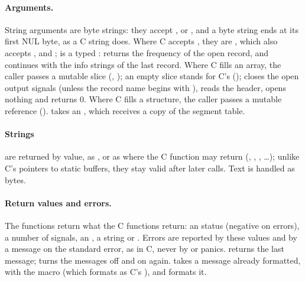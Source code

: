\paragraph{Arguments.} String arguments are byte strings: they accept ,
\code{\&[u8]} or , and a byte string ends at its first NUL byte, as a C
string does. Where C accepts , they are , which also
accepts ,  and ;
 is a typed :  returns the frequency of
the open record, and  continues with the info strings of the last
record. Where C fills an array, the caller passes a mutable slice
(, ); an empty slice stands for
C's  (); 
closes the open output signals (unless the record name begins with \code{+}), reads the
header, opens nothing and returns 0. Where C fills a structure, the caller passes a
mutable reference ().  takes an
, which receives a copy of the segment table.

\paragraph{Strings} are returned by value, as , or as
 where the C function may return  (,
, , \ldots); unlike C's pointers to static buffers, they stay
valid after later calls. Text is handled as bytes.

\paragraph{Return values and errors.} The functions return what the C functions return:
an  status (negative on errors), a number of signals, an , a string
or . Errors are reported by these values and by a message on the standard
error, as in C, never by  or panics.  returns the last
message;  turns the messages off and  on again.
 takes a message already formatted, with the macro
 (which formats as C's ), and  formats it.

